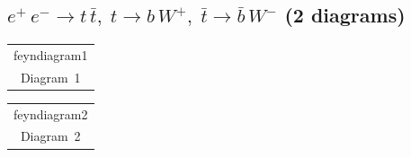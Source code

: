 \documentclass[a4paper,11pt]{article}
\makeatletter
\newcommand{\FeynDiagram}[1]{\csname feyndiagram#1\endcsname}
\newcommand{\FeynCell}[1]{\begin{tabular}[t]{@{}c@{}}\FeynDiagram{#1}\\[1ex]\small Diagram~#1\end{tabular}}
\makeatother
\begin{document}
\setlength{\parindent}{0pt}
\subsection*{$e^{+}\,e^{-} \to t\,\bar{t},\; t \to b\,W^{+},\; \bar{t} \to \bar{b}\,W^{-}$ \normalfont(2 diagrams)}
\noindent \FeynCell{1}\hfill \FeynCell{2}\par\bigskip
\end{document}
